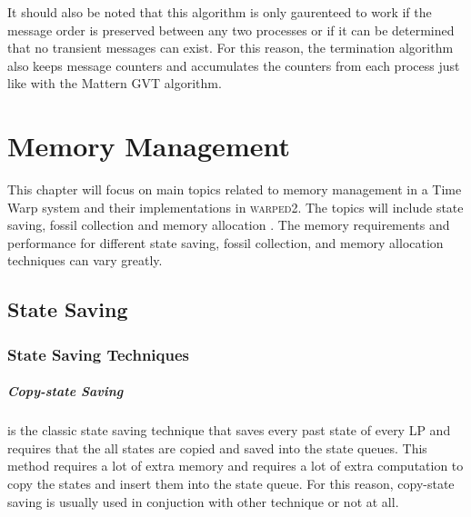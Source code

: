 \documentclass[11pt]{book}
\begin{document}
It should also be noted that this algorithm is only gaurenteed to work if the message order is
preserved between any two processes or if it can be determined that no transient messages can exist.
For this reason, the termination algorithm also keeps message counters and accumulates the counters
from each process just like with the Mattern GVT algorithm.



\chapter{Memory Management}\label{memory_management}

This chapter will focus on main topics related to memory management in a Time Warp system and their
implementations in \textsc{warped2}.  The topics will include state saving, fossil collection and
memory allocation \cite{fujimoto-90,fujimoto-00}.  The memory requirements and performance for
different state saving, fossil collection, and memory allocation techniques can vary greatly.

\section{State Saving}

\subsection{State Saving Techniques}

\paragraph{Copy-state Saving} is the classic state saving technique that saves every past state of
every LP and requires that the all states are copied and saved into the state queues.  This method
requires a lot of extra memory and requires a lot of extra computation to copy the states and insert
them into the state queue.  For this reason, copy-state saving is usually used in conjuction with
other technique or not at all.
\end{document}
